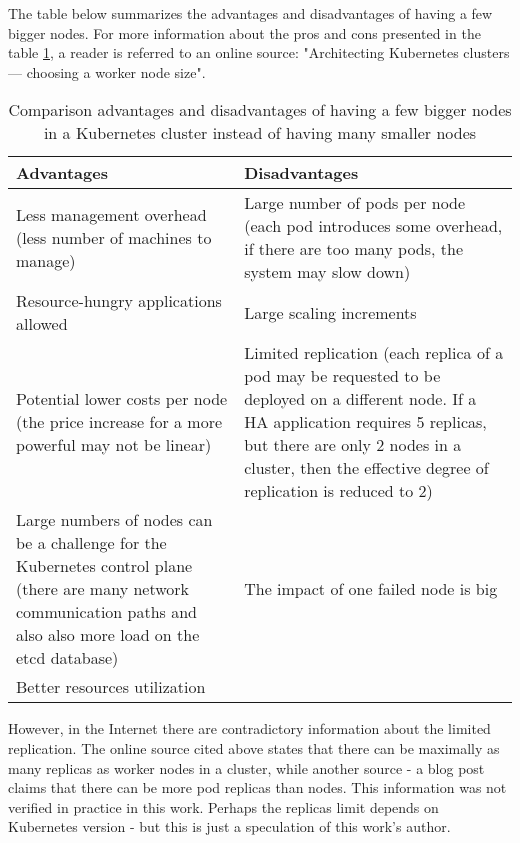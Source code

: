 The table below summarizes the advantages and disadvantages of having a few bigger nodes. For more information about the pros and cons presented in the table \ref{tab:pros-cons-large-nodes}, a reader is referred to an online source: "Architecting Kubernetes clusters — choosing a worker node size"\cite{kubernetes-node-size}.

\begin{table}[H]
\begin{tabularx}{1\textwidth} {
  | >{\centering\arraybackslash}X
  | >{\centering\arraybackslash}X | }
 \hline
  \textbf{Advantages} & \textbf{Disadvantages}  \\
 \hline
 Less management overhead (less number of machines to manage)  & Large number of pods per node (each pod introduces some overhead, if there are too many pods, the system may slow down)   \\
 \hline
 Resource-hungry applications allowed  & Large scaling increments  \\
 \hline
  Potential lower costs per node (the price increase for a more powerful may not be linear)  & Limited replication (each replica of a pod may be requested to be deployed on a different node. If a HA application requires 5 replicas, but there are only 2 nodes in a cluster, then the effective degree of replication is reduced to 2)  \\
 \hline
  Large numbers of nodes can be a challenge for the Kubernetes control plane (there are many network communication paths and also also more load on the etcd database) & The impact of one failed node is big   \\
 \hline
  Better resources utilization &   \\
 \hline
\end{tabularx}
\caption{\label{tab:pros-cons-large-nodes}Comparison advantages and disadvantages of having a few bigger nodes in a Kubernetes cluster instead of having many smaller nodes\cite{kubernetes-node-size}}
\end{table}

However, in the Internet there are contradictory information about the limited replication. The online source cited above\cite{kubernetes-node-size} states that there can be maximally as many replicas as worker nodes in a cluster, while another source - a blog post\cite{learnk8s-ll} claims that there can be more pod replicas than nodes. This information was not verified in practice in this work. Perhaps the replicas limit depends on Kubernetes version - but this is just a speculation of this work's author.

